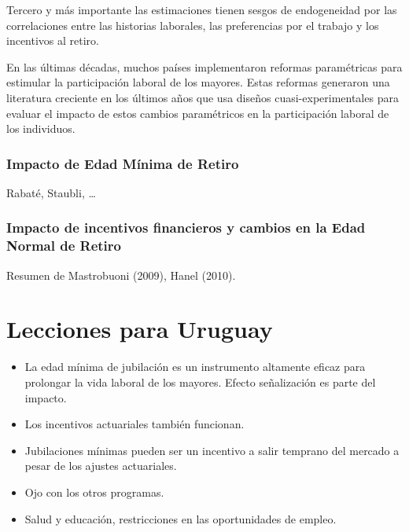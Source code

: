 \documentclass[]{article}
\providecommand{\tightlist}{%
  \setlength{\itemsep}{0pt}\setlength{\parskip}{0pt}}
\begin{document}
Tercero y más importante las estimaciones tienen sesgos de endogeneidad
por las correlaciones entre las historias laborales, las preferencias
por el trabajo y los incentivos al retiro.

En las últimas décadas, muchos países implementaron reformas
paramétricas para estimular la participación laboral de los mayores.
Estas reformas generaron una literatura creciente en los últimos años
que usa diseños cuasi-experimentales para evaluar el impacto de estos
cambios paramétricos en la participación laboral de los individuos.

\hypertarget{impacto-de-edad-muxednima-de-retiro}{%
\subsubsection{Impacto de Edad Mínima de
Retiro}\label{impacto-de-edad-muxednima-de-retiro}}

Rabaté, Staubli, \ldots{}

\hypertarget{impacto-de-incentivos-financieros-y-cambios-en-la-edad-normal-de-retiro}{%
\subsubsection{Impacto de incentivos financieros y cambios en la Edad
Normal de
Retiro}\label{impacto-de-incentivos-financieros-y-cambios-en-la-edad-normal-de-retiro}}

Resumen de Mastrobuoni (2009), Hanel (2010).

\hypertarget{lecciones-para-uruguay}{%
\section{Lecciones para Uruguay}\label{lecciones-para-uruguay}}

\begin{itemize}
\tightlist
\item
  La edad mínima de jubilación es un instrumento altamente eficaz para
  prolongar la vida laboral de los mayores. Efecto señalización es parte
  del impacto.
\item
  Los incentivos actuariales también funcionan.
\item
  Jubilaciones mínimas pueden ser un incentivo a salir temprano del
  mercado a pesar de los ajustes actuariales.
\item
  Ojo con los otros programas.
\item
  Salud y educación, restricciones en las oportunidades de empleo.
\end{itemize}
\end{document}
